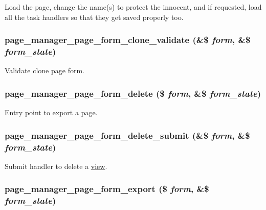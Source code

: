 Load the page, change the name(s) to protect the innocent, and if requested, load all the task handlers so that they get saved properly too. \hypertarget{page_8admin_8inc_a3388dc8f1aee6ef242e99cd13585a74b}{
\subsubsection[{page\_\-manager\_\-page\_\-form\_\-clone\_\-validate}]{\setlength{\rightskip}{0pt plus 5cm}page\_\-manager\_\-page\_\-form\_\-clone\_\-validate (\&\$ {\em form}, \/  \&\$ {\em form\_\-state})}}
\label{page_8admin_8inc_a3388dc8f1aee6ef242e99cd13585a74b}
Validate clone page form. \hypertarget{page_8admin_8inc_a29dc53e453b375306ff5d02a2a5640cf}{
\subsubsection[{page\_\-manager\_\-page\_\-form\_\-delete}]{\setlength{\rightskip}{0pt plus 5cm}page\_\-manager\_\-page\_\-form\_\-delete (\$ {\em form}, \/  \&\$ {\em form\_\-state})}}
\label{page_8admin_8inc_a29dc53e453b375306ff5d02a2a5640cf}
Entry point to export a page. \hypertarget{page_8admin_8inc_a2b4d1d14abfcc04f441e2872fb3f2e6d}{
\subsubsection[{page\_\-manager\_\-page\_\-form\_\-delete\_\-submit}]{\setlength{\rightskip}{0pt plus 5cm}page\_\-manager\_\-page\_\-form\_\-delete\_\-submit (\&\$ {\em form}, \/  \&\$ {\em form\_\-state})}}
\label{page_8admin_8inc_a2b4d1d14abfcc04f441e2872fb3f2e6d}
Submit handler to delete a \hyperlink{classview}{view}. \hypertarget{page_8admin_8inc_a23e5e221703cba1aa7a7c45d134537a9}{
\subsubsection[{page\_\-manager\_\-page\_\-form\_\-export}]{\setlength{\rightskip}{0pt plus 5cm}page\_\-manager\_\-page\_\-form\_\-export (\$ {\em form}, \/  \&\$ {\em form\_\-state})}}
